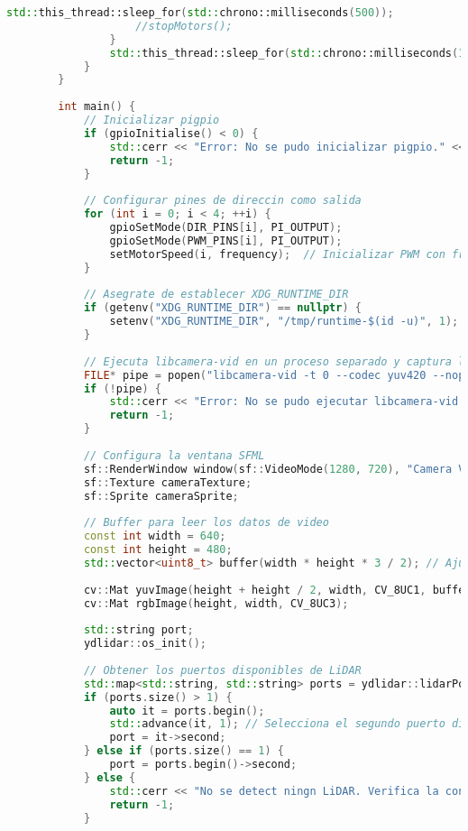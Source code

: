 \begin{lstlisting}[language={C++}, caption={Segundo ajuste de c\'odigo}, label={SegundoAjuste}]
                    std::this_thread::sleep_for(std::chrono::milliseconds(500));
                    //stopMotors();
                }
                std::this_thread::sleep_for(std::chrono::milliseconds(100));
            }
        }
        
        int main() {
            // Inicializar pigpio
            if (gpioInitialise() < 0) {
                std::cerr << "Error: No se pudo inicializar pigpio." << std::endl;
                return -1;
            }
        
            // Configurar pines de direccin como salida
            for (int i = 0; i < 4; ++i) {
                gpioSetMode(DIR_PINS[i], PI_OUTPUT);
                gpioSetMode(PWM_PINS[i], PI_OUTPUT);
                setMotorSpeed(i, frequency);  // Inicializar PWM con frecuencia inicial
            }
        
            // Asegrate de establecer XDG_RUNTIME_DIR
            if (getenv("XDG_RUNTIME_DIR") == nullptr) {
                setenv("XDG_RUNTIME_DIR", "/tmp/runtime-$(id -u)", 1);
            }
        
            // Ejecuta libcamera-vid en un proceso separado y captura la salida en YUV, sin previsualizacn
            FILE* pipe = popen("libcamera-vid -t 0 --codec yuv420 --nopreview -o -", "r");
            if (!pipe) {
                std::cerr << "Error: No se pudo ejecutar libcamera-vid." << std::endl;
                return -1;
            }
        
            // Configura la ventana SFML
            sf::RenderWindow window(sf::VideoMode(1280, 720), "Camera Visualization with LiDAR");
            sf::Texture cameraTexture;
            sf::Sprite cameraSprite;
        
            // Buffer para leer los datos de video
            const int width = 640;
            const int height = 480;
            std::vector<uint8_t> buffer(width * height * 3 / 2); // Ajusta el tamao del buffer para YUV420
        
            cv::Mat yuvImage(height + height / 2, width, CV_8UC1, buffer.data());
            cv::Mat rgbImage(height, width, CV_8UC3);
        
            std::string port;
            ydlidar::os_init();
        
            // Obtener los puertos disponibles de LiDAR
            std::map<std::string, std::string> ports = ydlidar::lidarPortList();
            if (ports.size() > 1) {
                auto it = ports.begin();
                std::advance(it, 1); // Selecciona el segundo puerto disponible
                port = it->second;
            } else if (ports.size() == 1) {
                port = ports.begin()->second;
            } else {
                std::cerr << "No se detect ningn LiDAR. Verifica la conexin." << std::endl;
                return -1;
            }
        

\end{lstlisting}
